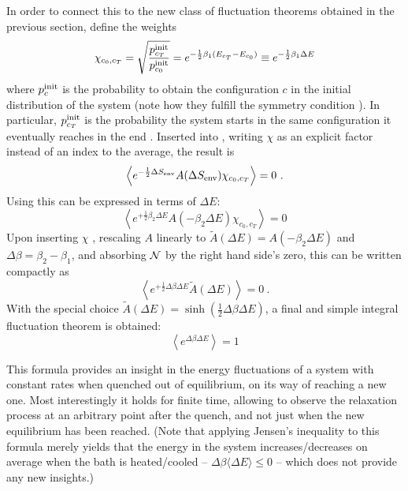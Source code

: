In order to connect this to the new class of fluctuation theorems obtained in the previous section, define the weights
%
\begin{equation}
	\label{eqn:chi example value}
	  \chi_{c_0,c_T}
	= \sqrt{\frac{p_{c_T}^{\text{init}}}{p_{c_0}^{\text{init}}}}
	= e^{-\frac12\beta_1(E_{c_T} - E_{c_0})}
	\equiv e^{-\frac12\beta_1\Delta E}
\end{equation}
%
where \(p_c^{\text{init}}\) is the probability to obtain the configuration \(c\) in the initial distribution of the system (note how they fulfill the symmetry condition ). In particular, \(p_{c_T}^{\text{init}}\) is the probability the system starts in the same configuration it eventually reaches in the end . Inserted into , writing \(\chi\) as an explicit factor instead of an index to the average, the result is
%
\begin{equation}
	\left\langle e^{-\frac12\Delta S_\text{env}} A(\Delta S_\text{env}) \chi_{c_0,c_T} \right\rangle = 0 ~.
\end{equation}
%
Using  this can be expressed in terms of \(\Delta E\):
%
\begin{equation}
	\left\langle e^{+\frac12\beta_2\Delta E} A(-\beta_2\Delta E) \chi_{c_0,c_T} \right\rangle = 0
\end{equation}
%
Upon inserting \(\chi\) , rescaling \(A\) linearly to \(\tilde A(\Delta E) = A(-\beta_2\Delta E)\) and \(\Delta\beta = \beta_2-\beta_1\), and absorbing \(\mathcal{N}\) by the right hand side's zero, this can be written compactly as
%
\begin{equation}
	\left\langle e^{+\frac12\Delta\beta\Delta E} \tilde A(\Delta E) \right\rangle = 0 ~.
\end{equation}
%
With the special choice \(\tilde A(\Delta E) = \sinh(\frac12\Delta\beta\Delta E)\), a final and simple integral fluctuation theorem is obtained:
%
\begin{equation}
	\label{eqn:tingie quench fluctuation}
	\boxed{\left\langle e^{\Delta\beta \Delta E}\right\rangle = 1}
\end{equation}

This formula provides an insight in the energy fluctuations of a system with constant rates when quenched out of equilibrium, on its way of reaching a new one. Most interestingly it holds for finite time, allowing to observe the relaxation process at an arbitrary point after the quench, and not just when the new equilibrium has been reached. (Note that applying Jensen's inequality to this formula merely yields that the energy in the system increases/decreases on average when the bath is heated/cooled -- \(\Delta\beta\langle\Delta E\rangle\leq0\) -- which does not provide any new insights.)








